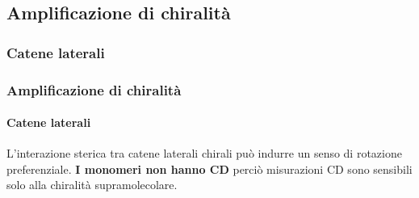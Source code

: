 \begin{frame}
                                      \end{frame}
\subsection{Amplificazione di chiralità}\subsubsection{Catene laterali}\begin{frame}\frametitle{Amplificazione di chiralità}\framesubtitle{Catene laterali}
L'interazione sterica tra catene laterali chirali può indurre un senso di rotazione preferenziale. \textbf{I monomeri non hanno CD} perciò misurazioni CD sono sensibili solo alla chiralità supramolecolare.\vspace{10pt}
\begin{columns}

\end{columns}
\end{frame}
